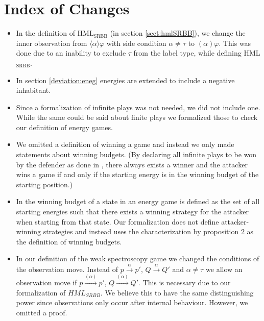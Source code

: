 \section{Index of Changes} \label{index}
\begin{itemize}
    \item In the definition of HML$_\text{SRBB}$ (in section \ref{sect:hmlSRBB}), we change the inner observation from
    $\langle\alpha\rangle\varphi$ with side condition $\alpha \neq \tau$ to $(\alpha)\varphi$.
    This was done due to an inability to exclude $\tau$ from the label type, while defining HML$_\text{SRBB}$. 
    
    \item In section \ref{deviation:eneg} energies are extended to include a negative inhabitant. 
    
    \item Since a formalization of infinite plays was not needed, we did not include one. While the 
    same could be said about finite plays we formalized those to check our definition of energy games.
    
    \item We omitted a definition of winning a game and instead we only made statements about winning budgets. 
    (By declaring all infinite plays to be won by the defender as done in \cite{bisping2023lineartimebranchingtime}, 
    there always exists a winner and the attacker wins a game if and only if the starting energy is in the winning budget of the starting position.)
    
    \item In \cite{bisping2023lineartimebranchingtime} the winning budget of a state in an energy game 
    is defined as the set of all starting energies such that there exists a winning strategy for the attacker 
    when starting from that state. Our formalization does not define attacker-winning strategies and instead 
    uses the characterization by proposition $2$ \cite[p. 9]{bisping2023lineartimebranchingtime} as the definition of winning budgets.
    
    \item In our definition of the weak spectroscopy game we changed the conditions of the observation move. 
    Instead of $p \overset{\alpha}{\longrightarrow}p'$, $Q \overset{\alpha}{\longrightarrow} Q'$ and $\alpha \neq \tau$
    we allow an observation move if  $p \overset{(\alpha)}{\longrightarrow}p'$, $Q \overset{(\alpha)}{\longrightarrow} Q'$.
    This is necessary due to our formalization of $HML_{SRBB}$. We believe this to have the same distinguishing power 
    since observations only occur after internal behaviour. However, we omitted a proof. 
    

\end{itemize}

